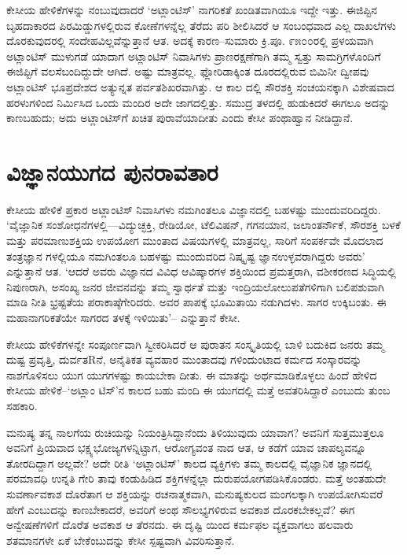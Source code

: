 ಕೇಸೀಯ ಹೇಳಿಕೆಗಳನ್ನು ನಂಬುವುದಾದರೆ ‘ಅಟ್ಲಾಂಟಿಸ್​’ ನಾಗರಿಕತೆ ಖಂಡಿತವಾಗಿಯೂ ಇದ್ದೇ ಇತ್ತು. ಈಜಿಪ್ಟಿನ ಬೃಹದಾಕಾರದ ಪಿರಮಿಡ್ಡುಗಳಲ್ಲಿರುವ ಕೋಣೆಗಳನ್ನೆಲ್ಲ ತೆರೆದು ಪರಿ ಶೀಲಿಸಿದರೆ ಆ ಸಂಬಂಧವಾದ ಎಲ್ಲ ದಾಖಲೆಗಳು ದೊರಕುವುದರಲ್ಲಿ ಸಂದೇಹವಿಲ್ಲವೆನ್ನುತ್ತಾನೆ ಆತ. ಅದಕ್ಕೆ ಕಾರಣ–ಸುಮಾರು ಕ್ರಿ.ಪೂ. ೯೫೦೦ರಲ್ಲಿ ಪ್ರಳಯವಾಗಿ ಅಟ್ಲಾಂಟಿಸ್ ಮುಳುಗಡೆ ಯಾದಾಗ ಅಟ್ಲಾಂಟಿಸ್ ನಿವಾಸಿಗಳು ಪ್ರಾಣರಕ್ಷಣೆಗಾಗಿ ತಮ್ಮ ಸ್ವತ್ತು ಸಾಮಗ್ರಿಗಳೊಂದಿಗೆ ಈಜಿಪ್ಟಿಗೆ ವಲಸೆಬಂದಿದ್ದುದೇ ಆಗಿದೆ. ಅಷ್ಟು ಮಾತ್ರವಲ್ಲ. ಫ್ಲೋರಿಡಾಕ್ಕಿಂತ ದೂರದಲ್ಲಿರುವ ಬಿಮಿನೀ ದ್ವೀಪವು ಅಟ್ಲಾಂಟಿಸ್ ಭೂಪ್ರದೇಶದ ಅತ್ಯುನ್ನತ ಪರ್ವತಶಿಖರವಾಗಿತ್ತು. ಆ ಕಾಲ ದಲ್ಲಿ ಸೌರಶಕ್ತಿ ಸಂಚಯನಕ್ಕಾಗಿ ವಿಶೇಷವಾದ ಹರಳುಗಳಿಂದ ನಿರ್ಮಿಸಿದ ಒಂದು ಮಂದಿರ ಅದೇ ಜಾಗದಲ್ಲಿತ್ತು. ಸಮುದ್ರ ತಳದಲ್ಲಿ ಹುಡುಕಿದರೆ ಈಗಲೂ ಅದನ್ನು ಕಾಣಬಹುದು; ಅದು ಅಟ್ಲಾಂಟಿಸ್​ಗೆ ಖಚಿತ ಪುರಾವೆಯಾದೀತು ಎಂದು ಕೇಸೀ ಪಂಥಾಹ್ವಾನ ನೀಡಿದ್ದಾನೆ.


\section{ವಿಜ್ಞಾನಯುಗದ ಪುನರಾವತಾರ}

ಕೇಸೀಯ ಹೇಳಿಕೆ ಪ್ರಕಾರ ಅಟ್ಲಾಂಟಿಸ್ ನಿವಾಸಿಗಳು ನಮಗಿಂತಲೂ ವಿಜ್ಞಾನದಲ್ಲಿ ಬಹಳಷ್ಟು ಮುಂದುವರಿದಿದ್ದರು. ‘ವೈಜ್ಞಾನಿಕ ಸಂಶೋಧನೆಗಳಲ್ಲಿ—ವಿದ್ಯುಚ್ಛಕ್ತಿ, ರೇಡಿಯೋ, ಟೆಲಿವಿಷನ್, ಗಗನಯಾನ, ಜಲಾಂತರ್ನೌಕೆ, ಸೌರಶಕ್ತಿ ಬಳಕೆ ಮತ್ತು ಪರಮಾಣುಶಕ್ತಿಯ ಉಪಯೋಗ ಮುಂತಾದ ವಿಷಯಗಳಲ್ಲಿ ಮಾತ್ರವಲ್ಲ, ಸಾರಿಗೆ ಸಂಪರ್ಕವೇ ಮೊದಲಾದ ತಂತ್ರಜ್ಞಾನ ಗಳಲ್ಲಿಯೂ ನಮಗಿಂತಲೂ ಬಹಳಷ್ಟು ಮುಂದುವರಿದ ನಿಷ್ಕೃಷ್ಟ ಜ್ಞಾನಉಳ್ಳವರಾಗಿದ್ದರು ಅವರು’ ಎನ್ನುತ್ತಾನೆ ಆತ. ‘ಆದರೆ ಅವರು ವಿಜ್ಞಾನದ ವಿವಿಧ ಆವಿಷ್ಕಾರಗಳ ಶಕ್ತಿಯಿಂದ ಪ್ರಮತ್ತರಾಗಿ, ವಶೀಕರಣದ ಸಿದ್ಧಿಯಲ್ಲಿ ನಿಪುಣರಾಗಿ, ಅಸಂಖ್ಯ ಜನರ ಜೀವನವನ್ನು ತಮ್ಮ ಸ್ವಾರ್ಥತೆ ಮತ್ತು ಇಂದ್ರಿಯಲೋಲುಪತೆಗಳಿಗಾಗಿ ಬಲಿಪಶುವಾಗಿ ಮಾಡಿ ನೀತಿ ಭ್ರಷ್ಟತೆಯ ಪರಾಕಾಷ್ಠೆಗೇರಿದರು. ಅವರ ಪಾಪಕ್ಕೆ ಭೂಮಿತಾಯಿ ನಡುಗಿದಳು. ಸಾಗರ ಉಕ್ಕಿಬಂತು. ಈ ಮಹಾನಾಗರಿಕತೆಯೇ ಸಾಗರದ ತಳಕ್ಕೆ ಇಳಿಯಿತು’– ಎನ್ನುತ್ತಾನೆ ಕೇಸೀ.

ಕೇಸೀಯ ಹೇಳಿಕೆಗಳನ್ನೇ ಸಂಪೂರ್ಣವಾಗಿ ಸ್ವೀಕರಿಸಿದರೆ ಆ ಪುರಾತನ ಸಂಸ್ಕೃತಿಯಲ್ಲಿ ಬಾಳಿ ಬದುಕಿದ ಜನರು ತಮ್ಮ ದುಷ್ಟ ಪ್ರವೃತ್ತಿ, ದುರ್ವತRನೆ, ಅನೈತಿಕತ ವ್ಯವಹಾರ ಮುಂತಾದವು ಗಳಿಂದುಂಟಾದ ಕರ್ಮದ ಸಂಸ್ಕಾರವನ್ನು ನಾಶಗೊಳಿಸಲು ಯುಗ ಯುಗಗಳಷ್ಟು ಕಾಯಬೇಕಾ ದೀತು. ಈ ಮಾತನ್ನು ಅರ್ಥಮಾಡಿಕೊಳ್ಳಲು ಹಿಂದೆ ಹೇಳಿದ ಕೇಸೀಯ ಹೇಳಿಕೆ–‘ಅಟ್ಲಾಂ ಟಿಸ್​’ನ ಕಾಲದ ಬಹು ಮಂದಿ ಈ ಯುಗದಲ್ಲಿ ಮತ್ತೆ ಅವತರಿಸಿದ್ದಾರೆ ಎಂಬುದು ತುಂಬ ಸಹಕಾರಿ.

ಮನುಷ್ಯ ತನ್ನ ನಾಲಗೆಯ ರುಚಿಯನ್ನು ನಿಯಂತ್ರಿಸಿದ್ದಾನೆಂದು ತಿಳಿಯುವುದು ಯಾವಾಗ? ಅವನಿಗೆ ಸುತ್ತಮುತ್ತಲೂ ಅವನಿಗೆ ಪ್ರಿಯವಾದ ಭಕ್ಷ್ಯಭೋಜ್ಯಗಳನ್ನಿಟ್ಟಾಗ, ಆರೋಗ್ಯವಂತ ನಾದ ಆತ, ಆ ಕಡೆಗೆ ಯಾವ ಚಾಪಲ್ಯವನ್ನೂ ತೋರದಿದ್ದಾಗ ಅಲ್ಲವೇ? ಅದೇ ರೀತಿ ‘ಅಟ್ಲಾಂಟಿಸ್​​’ ಕಾಲದ ವ್ಯಕ್ತಿಗಳು ತಮ್ಮ ಕಾಲದಲ್ಲಿ ವೈಜ್ಞಾನಿಕ ಜ್ಞಾನದಲ್ಲಿ ಪರಮಾವಧಿ ಉನ್ನತಿ ಗೇರಿ ತಾವು ಕಂಡುಹಿಡಿದ ಶಕ್ತಿಗಳನ್ನೆಲ್ಲಾ ದುರುಪಯೋಗಪಡಿಸಿಕೊಂಡರು. ಮತ್ತೆ ಅಂತಹುದೇ ಸುವರ್ಣಾವಕಾಶ ದೊರೆತಾಗ ಆ ಶಕ್ತಿಯನ್ನು ರಚನಾತ್ಮಕವಾಗಿ, ಮನುಷ್ಯಕುಲದ ಮಂಗಲಕ್ಕಾಗಿ ಉಪಯೋಗಿಸುವರೆ ಹೇಗೆ ಎಂಬುದನ್ನು ಕಾಣಬೇಕಾದರೆ, ಅವರಿಗೆ ಅಂಥ ಸೌಲಭ್ಯಗಳಿರುವ ಅವಕಾಶ ದೊರಕಬೇಕಲ್ಲವೆ? ಈಗ ಅನ್ವೇಷಣೆಗಳಿಗೆ ದೊರೆತ ಅವಕಾಶ ಆ ತೆರನದು. ಈ ದೃಷ್ಟಿ ಯಿಂದ ಕರ್ಮಫಲ ವ್ಯಕ್ತವಾಗಲು ಹಲವಾರು ಶತಮಾನಗಳೇ ಏಕೆ ಬೇಕೆಂಬುದನ್ನು ಕೇಸೀ ಸ್ಪಷ್ಟವಾಗಿ ವಿವರಿಸುತ್ತಾನೆ.


